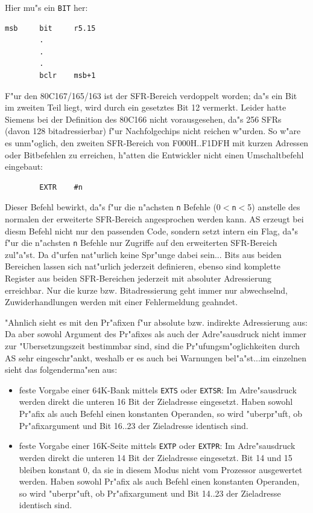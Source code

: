 \documentclass[12pt,a4paper,twoside]{report}
\newcommand{\tty}[1]{{\tt #1}}
\newcommand{\asname}{AS}
\begin{document}
Hier mu"s ein \tty{BIT} her:
\begin{verbatim}
msb     bit     r5.15
        .
        .
        .
        bclr    msb+1
\end{verbatim}
F"ur den 80C167/165/163 ist der SFR-Bereich verdoppelt worden; da"s ein Bit im
zweiten Teil liegt, wird durch ein gesetztes Bit 12 vermerkt.  Leider
hatte Siemens bei der Definition des 80C166 nicht vorausgesehen, da"s
256 SFRs (davon 128 bitadressierbar) f"ur Nachfolgechips nicht reichen
w"urden. So w"are es unm"oglich, den zweiten SFR-Bereich von F000H..F1DFH
mit kurzen Adressen oder Bitbefehlen zu erreichen, h"atten die Entwickler
nicht einen Umschaltbefehl eingebaut:
\begin{verbatim}
        EXTR    #n
\end{verbatim}
Dieser Befehl bewirkt, da"s f"ur die n"achsten \tty{n} Befehle (0$<$\tty{n}$<$5)
anstelle des normalen der erweiterte SFR-Bereich angesprochen werden kann.
\asname{} erzeugt bei diesm Befehl nicht nur den passenden Code, sondern setzt
intern ein Flag, da"s f"ur die n"achsten \tty{n} Befehle nur Zugriffe auf den
erweiterten SFR-Bereich zul"a"st.  Da d"urfen nat"urlich keine Spr"unge
dabei sein... Bits aus beiden Bereichen lassen sich nat"urlich jederzeit
definieren, ebenso sind komplette Register aus beiden SFR-Bereichen
jederzeit mit absoluter Adressierung erreichbar.  Nur die kurze bzw.
Bitadressierung geht immer nur abwechselnd, Zuwiderhandlungen werden
mit einer Fehlermeldung geahndet.
\par
"Ahnlich sieht es mit den Pr"afixen f"ur absolute bzw. indirekte
Adressierung aus: Da aber sowohl Argument des Pr"afixes als auch der
Adre"sausdruck nicht immer zur "Ubersetzungszeit bestimmbar sind, sind
die Pr"ufungsm"oglichkeiten durch \asname{} sehr eingeschr"ankt, weshalb er es
auch bei Warnungen bel"a"st...im einzelnen sieht das folgenderma"sen aus:
\begin{itemize}
\item{feste Vorgabe einer 64K-Bank mittels \tty{EXTS} oder \tty{EXTSR}:
      Im Adre"sausdruck werden direkt die unteren 16 Bit der Zieladresse
      eingesetzt.  Haben sowohl Pr"afix als auch Befehl einen konstanten
      Operanden, so wird "uberpr"uft, ob Pr"afixargument und Bit 16..23 der
      Zieladresse identisch sind.}
\item{feste Vorgabe einer 16K-Seite mittels \tty{EXTP} oder \tty{EXTPR}:
      Im Adre"sausdruck werden direkt die unteren 14 Bit der Zieladresse
      eingesetzt.  Bit 14 und 15 bleiben konstant 0, da sie in diesem Modus
      nicht vom Prozessor ausgewertet werden.  Haben sowohl Pr"afix als
      auch Befehl einen konstanten Operanden, so wird "uberpr"uft, ob
      Pr"afixargument und Bit 14..23 der Zieladresse identisch sind.}
\end{itemize}
\end{document}
